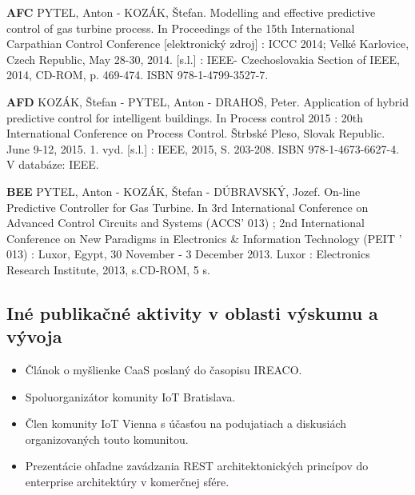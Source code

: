 \begin{enumerate}[label={[\arabic*]}]
  \item \textbf{AFC} PYTEL, Anton - KOZÁK, Štefan. Modelling and effective predictive control of gas turbine process. In Proceedings of the 15th International Carpathian Control Conference [elektronický zdroj] : ICCC 2014; Velké Karlovice, Czech Republic, May 28-30, 2014. [s.l.] : IEEE- Czechoslovakia Section of IEEE, 2014, CD-ROM, p. 469-474. ISBN 978-1-4799-3527-7.
  \item \textbf{AFD} KOZÁK, Štefan - PYTEL, Anton - DRAHOŠ, Peter. Application of hybrid predictive control for intelligent buildings. In Process control 2015 : 20th International Conference on Process Control. Štrbské Pleso, Slovak Republic. June 9-12, 2015. 1. vyd. [s.l.] : IEEE, 2015, S. 203-208. ISBN 978-1-4673-6627-4. V databáze: IEEE.
  \item \textbf{BEE} PYTEL, Anton - KOZÁK, Štefan - DÚBRAVSKÝ, Jozef. On-line Predictive Controller for Gas Turbine. In 3rd International Conference on Advanced Control Circuits and Systems (ACCS' 013) ; 2nd International Conference on New Paradigms in Electronics \& Information Technology (PEIT ' 013) : Luxor, Egypt, 30 November - 3 December 2013. Luxor : Electronics Research Institute, 2013, s.CD-ROM, 5 s.
\end{enumerate}
\subsection*{Iné publikačné aktivity v oblasti výskumu a vývoja}
\begin{itemize}
\item Článok o myšlienke CaaS poslaný do časopisu IREACO.
\item Spoluorganizátor komunity IoT Bratislava.
\item Člen komunity IoT Vienna s účasťou na podujatiach a diskusiách organizovaných touto komunitou.
\item Prezentácie ohľadne zavádzania REST architektonických princípov do enterprise architektúry v komerčnej sfére.
\end{itemize}